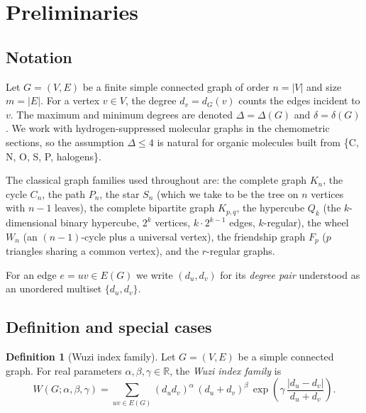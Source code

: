 \documentclass[11pt,a4paper]{article}
\theoremstyle{definition}
\newtheorem{definition}[theorem]{Definition}
\newcommand{\Wuzi}{W(G;\alpha,\beta,\gamma)}
\begin{document}
\section{Preliminaries}\label{sec:prelim}

\subsection{Notation}\label{sec:notation}

Let $G=(V,E)$ be a finite simple connected graph of order
$n=|V|$ and size $m=|E|$. For a vertex $v\in V$, the degree
$d_v=d_G(v)$ counts the edges incident to $v$. The maximum and
minimum degrees are denoted $\Delta=\Delta(G)$ and
$\delta=\delta(G)$. We work with hydrogen-suppressed molecular
graphs in the chemometric sections, so the assumption $\Delta\le 4$
is natural for organic molecules built from \{C, N, O, S, P, halogens\}.

The classical graph families used throughout are:
the complete graph $K_n$, the cycle $C_n$, the path $P_n$, the star
$S_n$ (which we take to be the tree on $n$ vertices with $n-1$
leaves), the complete bipartite graph $K_{p,q}$, the hypercube
$Q_k$ (the $k$-dimensional binary hypercube, $2^k$ vertices,
$k\cdot 2^{k-1}$ edges, $k$-regular), the wheel $W_n$ (an $(n-1)$-cycle
plus a universal vertex), the friendship graph $F_p$ ($p$
triangles sharing a common vertex), and the $r$-regular graphs.

For an edge $e=uv\in E(G)$ we write $(d_u,d_v)$ for its
\emph{degree pair} understood as an unordered multiset
$\{d_u,d_v\}$.

\subsection{Definition and special cases}\label{sec:def}

\begin{definition}[Wuzi index family]\label{def:wuzi}
Let $G=(V,E)$ be a simple connected graph. For real parameters
$\alpha,\beta,\gamma\in\mathbb{R}$, the \emph{Wuzi index family}
is
\begin{equation}\label{eq:wuzi}
\Wuzi
=\sum_{uv\in E(G)}
(d_u d_v)^{\alpha}\,(d_u+d_v)^{\beta}\,
\exp\!\left(\gamma\,\frac{|d_u-d_v|}{d_u+d_v}\right).
\end{equation}
\end{definition}
\end{document}
